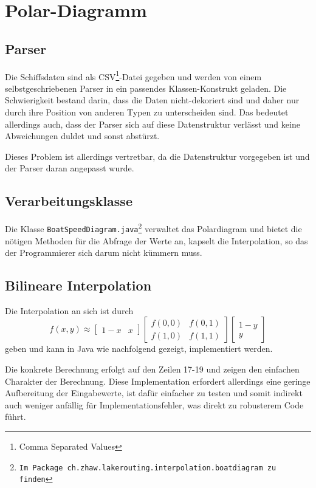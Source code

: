 \section{Polar-Diagramm}
\subsection{Parser}
Die Schiffsdaten sind als CSV\footnote{Comma Separated Values}-Datei
gegeben und werden von einem selbst\-geschriebenen Parser in ein
passendes Klassen-Konstrukt geladen. Die Schwierigkeit bestand darin,
dass die Daten nicht-dekoriert sind und daher nur durch ihre Position
von anderen Typen zu unterscheiden sind. Das bedeutet allerdings auch,
dass der Parser sich auf diese Datenstruktur verlässt und keine
Abweichungen duldet und sonst abstürzt.

Dieses Problem ist allerdings vertretbar, da die Datenstruktur
vorgegeben ist und der Parser daran angepasst wurde.

\subsection{Verarbeitungsklasse}
Die Klasse \texttt{BoatSpeedDiagram.java\footnote{Im Package 
ch.zhaw.lakerouting.interpolation.boatdiagram zu finden}} verwaltet das
Polardiagram und bietet die nötigen Methoden für die Abfrage der Werte
an, kapselt die Interpolation, so das der Programmierer sich darum nicht
kümmern muss.

\subsection{Bilineare Interpolation}\label{sss:bilinearinterpolation}
Die Interpolation an sich ist durch 
\begin{equation}
f(x,y) \approx \begin{bmatrix} 1-x & x \end{bmatrix} \begin{bmatrix}
f(0,0) & f(0,1) \\ f(1,0) & f(1,1) \end{bmatrix} \begin{bmatrix} 1 - y
\\ y \end{bmatrix}
\label{eq:bilineareinterpolation}
\end{equation}
geben und kann in Java wie nachfolgend gezeigt, implementiert werden.

 
Die konkrete Berechnung erfolgt auf den Zeilen 17-19 und zeigen den
einfachen Charakter der Berechnung. Diese Implementation erfordert
allerdings eine geringe Aufbereitung der Eingabewerte, ist dafür
einfacher zu testen und somit indirekt auch weniger anfällig für
Implementationsfehler, was direkt zu robusterem Code führt.

